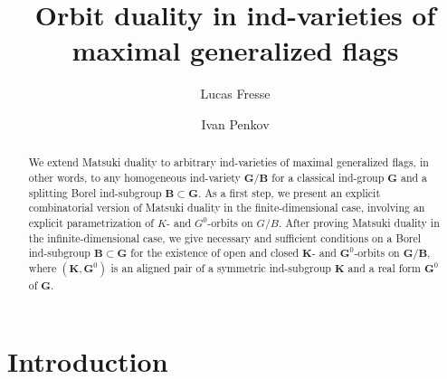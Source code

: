 \documentclass{amsart}
\theoremstyle{definition}
\begin{document}
\title[Orbit duality in ind-varieties of generalized flags]{Orbit duality in ind-varieties of maximal generalized flags}
\author{Lucas Fresse}
\address{Universit\'e de Lorraine, CNRS, Institut \'Elie Cartan de Lorraine, UMR 7502, Van\-doeuvre-l\`es-Nancy, F-54506 France}
\author{Ivan Penkov}
\address{Jacobs University Bremen, Campus Ring 1, 28759 Bremen, Germany}



\begin{abstract}
We extend Matsuki duality to arbitrary ind-varieties of maximal generalized flags, in other words, to any homogeneous ind-variety $\mathbf{G}/\mathbf{B}$ for a classical ind-group $\mathbf{G}$ and a splitting Borel ind-subgroup $\mathbf{B}\subset\mathbf{G}$.  As a first step, we present an explicit combinatorial version of Matsuki duality in the finite-dimensional case, involving an explicit parametrization of $K$- and $G^0$-orbits on $G/B$.  After proving Matsuki duality in the infinite-dimensional case, we give necessary and sufficient conditions on a Borel ind-subgroup $\mathbf{B}\subset\mathbf{G}$ for the existence of open and closed $\mathbf{K}$- and $\mathbf{G}^0$-orbits on $\mathbf{G}/\mathbf{B}$, where $\left(\mathbf{K},\mathbf{G}^0\right)$ is an aligned pair of a symmetric ind-subgroup $\mathbf{K}$ and a real form $\mathbf{G}^0$ of $\mathbf{G}$.
\end{abstract}


\maketitle

\section{Introduction}

\label{S.intro}
\end{document}
